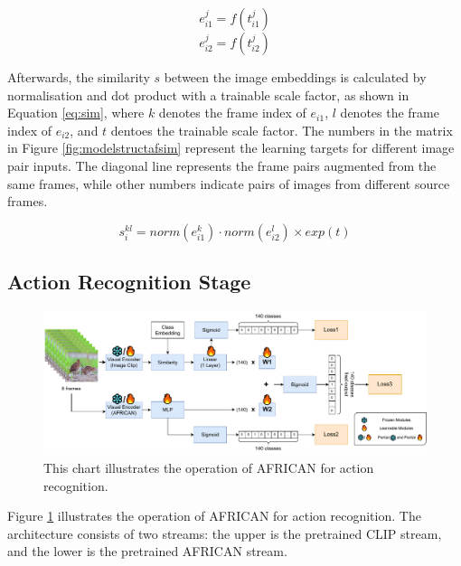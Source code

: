 \begin{equation}
    \label{eq:enc1}
    e_{i1}^j = f(t_{i1}^j)
\end{equation}
\begin{equation}
    \label{eq:enc2}
    e_{i2}^j = f(t_{i2}^j)
\end{equation}

Afterwards, the similarity $s$ between the image embeddings is calculated by normalisation and dot product with a trainable scale factor, as shown in Equation \ref{eq:sim}, where $k$ denotes the frame index of $e_{i1}$, $l$ denotes the frame index of $e_{i2}$, and $t$ dentoes the trainable scale factor. The numbers in the matrix in Figure \ref{fig:modelstructafsim} represent the learning targets for different image pair inputs. The diagonal line represents the frame pairs augmented from the same frames, while other numbers indicate pairs of images from different source frames. 

\begin{equation}
    \label{eq:sim}
    s_{i}^{kl} = norm(e_{i1}^{k}) \cdot norm(e_{i2}^{l}) \times exp(t)
\end{equation}




\subsection{Action Recognition Stage}

\begin{figure}[ht]
    \centering
    \includegraphics[width=1.0\textwidth]{assets/charts/3_4_ModelStructureAF}
    \caption[Operation of AFRICAN for action recognition]{This chart illustrates the operation of AFRICAN for action recognition.}
    \label{fig:modelstructaf_ar}
\end{figure}

Figure \ref{fig:modelstructaf_ar} illustrates the operation of AFRICAN for action recognition. The architecture consists of two streams: the upper is the pretrained CLIP stream, and the lower is the pretrained AFRICAN stream. 

